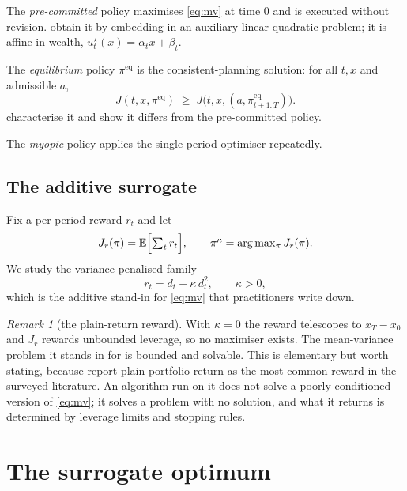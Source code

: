 \documentclass[11pt,a4paper]{article}
\theoremstyle{plain}
\theoremstyle{definition}
\theoremstyle{remark}
\newtheorem{remark}[theorem]{Remark}
\newcommand{\E}{\mathbb{E}}
\newcommand{\pieq}{\pi^{\mathrm{eq}}}
\newcommand{\pir}{\pi^{\kappa}}
\begin{document}
The \emph{pre-committed} policy maximises \eqref{eq:mv} at time $0$ and is
executed without revision. \citet{ling} obtain it by embedding in an auxiliary
linear-quadratic problem; it is affine in wealth, $u^{\star}_t(x)=\alpha_tx+\beta_t$.

The \emph{equilibrium} policy $\pieq$ is the consistent-planning solution: for all
$t,x$ and admissible $a$,
\begin{equation}
J(t,x,\pieq)\;\ge\;J\bigl(t,x,(a,\pieq_{t+1:T})\bigr).
\label{eq:equilibrium}
\end{equation}
\citet{basak} characterise it and show it differs from the pre-committed policy.

The \emph{myopic} policy applies the single-period optimiser repeatedly.

\subsection{The additive surrogate}

Fix a per-period reward $r_t$ and let
\begin{equation}
J_r(\pi)=\E\Bigl[\textstyle\sum_{t}r_t\Bigr],\qquad
\pir=\arg\max_{\pi}J_r(\pi).
\end{equation}
We study the variance-penalised family
\begin{equation}
r_t=d_t-\kappa\,d_t^{2},\qquad \kappa>0 ,
\label{eq:reward}
\end{equation}
which is the additive stand-in for \eqref{eq:mv} that practitioners write down.

\begin{remark}[the plain-return reward]
With $\kappa=0$ the reward telescopes to $x_T-x_0$ and $J_r$ rewards unbounded
leverage, so no maximiser exists. The mean-variance problem it stands in for is
bounded and solvable. This is elementary but worth stating, because
\citet{bai} report plain portfolio return as the most common reward in the
surveyed literature. An algorithm run on it does not solve a poorly conditioned
version of \eqref{eq:mv}; it solves a problem with no solution, and what it
returns is determined by leverage limits and stopping rules.
\end{remark}

\section{The surrogate optimum}\label{sec:recursion}
\end{document}
